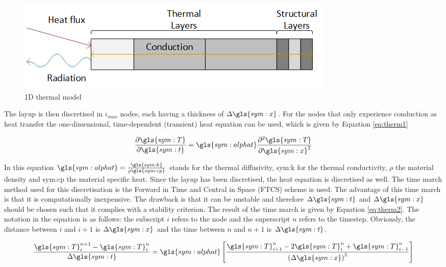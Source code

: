 \begin{figure}[H]
	\centering
	\includegraphics{Figure/1dthermal.png}
	\caption{1D thermal model}
	\label{fig:1dthermal}
\end{figure}

The layup is then discretised in $i_{max}$ nodes, each having a thickness of $\Delta \gls{sym:x}$. For the nodes that only experience conduction as heat transfer the one-dimensional, time-dependent (transient) heat equation can be used, which is given by Equation \eqref{eq:therm1}

\begin{equation}
\frac{\partial \gls{sym:T}}{\partial \gls{sym:t}} = \gls{sym:alphat}\frac{\partial^2\gls{sym:T}}{\partial \gls{sym:x}^2}
\label{eq:therm1}
\end{equation}

In this equation $\gls{sym:alphat}=\frac{\gls{sym:k}}{\rho \gls{sym:cp}}$ stands for the thermal diffusivity, \gls{sym:k} for the thermal conductivity, $\rho$ the material density and \gls{sym:cp} the material specific heat. Since the layup has been discretised, the heat equation is discretised as well. The time march method used for this discretisation is the Forward in Time and Central in Space (FTCS) scheme is used. The advantage of this time march is that it is computationally inexpensive. The drawback is that it can be unstable and therefore $\Delta \gls{sym:t}$ and $\Delta \gls{sym:x}$ should be chosen such that it complies with a stability criterion. The result of the time march is given by Equation \eqref{eq:therm2}. The notation in the equation is as follows: the subscript $i$ refers to the node and the superscript $n$ refers to the timestep. Obviously, the distance between $i$ and $i+1$ is $\Delta \gls{sym:x}$ and the time between $n$ and $n+1$ is $\Delta \gls{sym:t}$.

\begin{equation}
\frac{\gls{sym:T}_i^{n+1}-\gls{sym:T}_i^n}{\Delta \gls{sym:t}} = \gls{sym:alphat}\left[\frac{\gls{sym:T}_{i+1}^n-2\gls{sym:T}_i^n+\gls{sym:T}_{i-1}^n}{\left(\Delta \gls{sym:x}\right)^2}\right]
\label{eq:therm2}
\end{equation}

